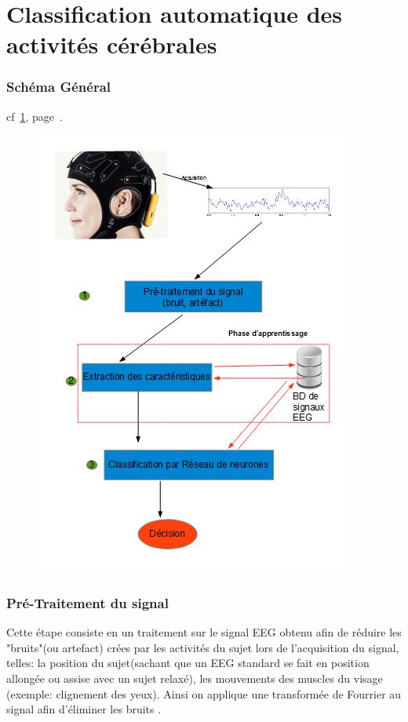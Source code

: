 \part{Classification automatique des activités cérébrales} %
\label{prt:classification_ _automatique_ _des_ _activités_ _cérébrales_}
	\section{Schéma Général} %
	cf~\ref{fig_orga}, page~\pageref{fig_orga}.
		\label{sec:schéma_générale}
		\begin{figure}[t]
			\centering
			    \includegraphics{../organigramme/orga.jpg} \\
				\label{fig_orga}
			\end{figure}

	\section{Pré-Traitement du signal} %
	\label{sec:pré_traitement_du_signal}
Cette étape consiste en un traitement sur le signal EEG obtenu afin de réduire les "bruits"(ou artefact) crées par les activités du sujet lors de l’acquisition du signal, telles: la position du sujet(sachant que un EEG standard se fait en position allongée ou assise avec un sujet relaxé), les mouvements des muscles du visage (exemple: clignement des yeux). Ainsi on applique une transformée de Fourrier au signal afin d'éliminer les bruits .
	
